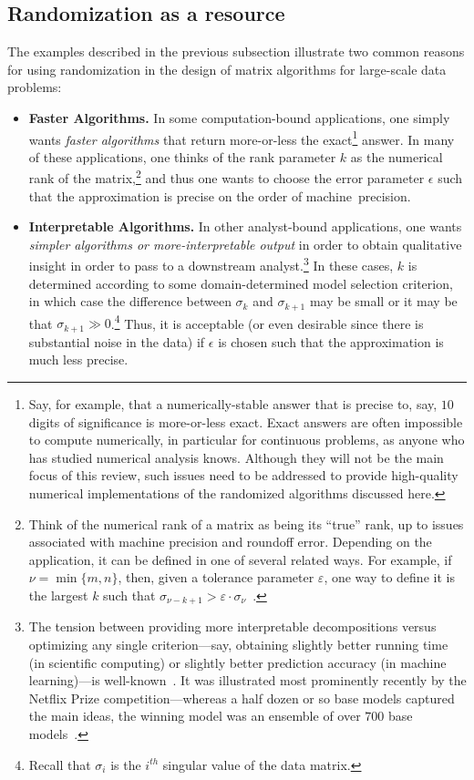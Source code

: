 \documentclass[twoside]{article}
\begin{document}
\subsection{Randomization as a resource}
\label{sxn:background1-resource}

The examples described in the previous subsection illustrate two common reasons 
for using randomization in the design of matrix algorithms for large-scale
data problems:
\begin{itemize}
\item
\textbf{Faster Algorithms.}
In some computation-bound applications, one simply wants \emph{faster 
algorithms} that return more-or-less the exact\footnote{Say, for example, that a numerically-stable answer that is precise to, say, 
$10$ digits of significance is more-or-less exact.  Exact answers are often 
impossible to compute numerically, in particular for continuous problems, as 
anyone who has studied numerical analysis knows.  Although they will not be 
the main focus of this review, such issues need to be addressed to provide 
high-quality numerical implementations of the randomized algorithms 
discussed here.}
answer.
In many of these applications, one thinks of the rank parameter $k$ as the
numerical rank of the matrix,\footnote{Think of the numerical rank of a matrix as being its ``true'' 
rank, up to issues associated with machine precision and roundoff error.  
Depending on the application, it can be defined in one of several related 
ways.  For example, if $\nu=\min\{m,n\}$, then, given a tolerance parameter 
$\varepsilon$, one way to define it is the largest $k$ such that 
$\sigma_{\nu-k+1} > \varepsilon \cdot \sigma_{\nu}$~\cite{GVL96}.}
and thus one wants to choose the error parameter $\epsilon$ such 
that the approximation is precise on the order of machine~precision.
\item
\textbf{Interpretable Algorithms.}
In other analyst-bound applications, one wants \emph{simpler 
algorithms or more-interpretable output} in order to obtain qualitative 
insight in order to pass to a downstream analyst.\footnote{The tension between providing more interpretable decompositions 
versus optimizing any single criterion---say, obtaining slightly better 
running time (in scientific computing) or slightly better prediction 
accuracy (in machine learning)---is well-known~\cite{CUR_PNAS}.  
It was illustrated most prominently recently by the Netflix Prize 
competition---whereas a half dozen or so base models captured the main 
ideas, the winning model was an ensemble of over $700$ base 
models~\cite{KBV09}.}
In these cases, $k$ is determined according to some domain-determined model 
selection criterion, in which case the difference between $\sigma_k$ and 
$\sigma_{k+1}$ may be small or it may be that $\sigma_{k+1} \gg 0$.\footnote{Recall that $\sigma_i$ is the $i^{th}$ singular value of the data matrix.}
Thus, it is acceptable (or even desirable since there is substantial noise in the data) 
if $\epsilon$ is chosen such that the approximation is much less precise.  
\end{itemize}
\end{document}
